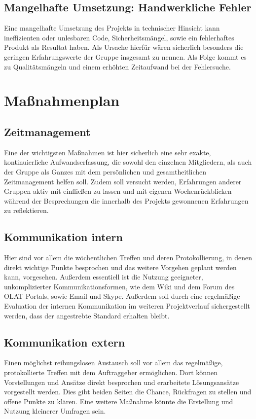 \Hack{\enlargethispage{1.0\baselineskip}}
\subsection{Mangelhafte Umsetzung: {\glqq}Handwerkliche Fehler{\grqq}}\label{r10}
  Eine mangelhafte Umsetzung des Projekts in technischer Hinsicht kann ineffizienten oder unlesbaren Code, Sicherheitsmängel, sowie ein fehlerhaftes Produkt als Resultat haben. Als Ursache hierfür wären sicherlich besonders die geringen Erfahrungswerte der Gruppe insgesamt zu nennen. Als Folge kommt es zu Qualitätsmängeln und einem erhöhten Zeitaufwand bei der Fehlersuche.


\section{Maßnahmenplan}

\subsection{Zeitmanagement}\label{m1} 
  Eine der wichtigsten Maßnahmen ist hier sicherlich eine sehr exakte, kontinuierliche Aufwandserfassung, die sowohl den einzelnen Mitgliedern, als auch der Gruppe als Ganzes mit dem persönlichen und gesamtheitlichen Zeitmanagement helfen soll.
  Zudem soll versucht werden, Erfahrungen anderer Gruppen aktiv mit einfließen zu lassen und mit eigenen Wochenrückblicken während der Besprechungen die innerhalb des Projekts ge\-won\-nenen Erfahrungen zu reflektieren.


\subsection{Kommunikation intern}\label{m2}
  Hier sind vor allem die wöchentlichen Treffen und deren Protokollierung, in denen direkt wichtige Punkte besprochen und das weitere Vorgehen geplant werden kann, vorgesehen. Außerdem essentiell ist die Nutzung geeigneter, unkomplizierter Kommunikationsformen, wie dem Wiki und dem Forum des OLAT-Portals, sowie Email und Skype. Außerdem soll durch eine regelmäßige Evaluation der internen Kommunikation im weiteren Projektverlauf sichergestellt werden, dass der angestrebte Standard erhalten bleibt.


\subsection{Kommunikation extern}\label{m3}
  Einen möglichst reibungslosen Austausch soll vor allem das regelmäßige, protokollierte Treffen mit dem Auftraggeber ermöglichen. Dort können Vorstellungen und Ansätze direkt besprochen und erarbeitete Lösungsansätze vorgestellt werden. Dies gibt beiden Seiten die Chance, Rückfragen zu stellen und offene Punkte zu klären. Eine weitere Maßnahme könnte die Erstellung und Nutzung kleinerer Umfragen sein.


